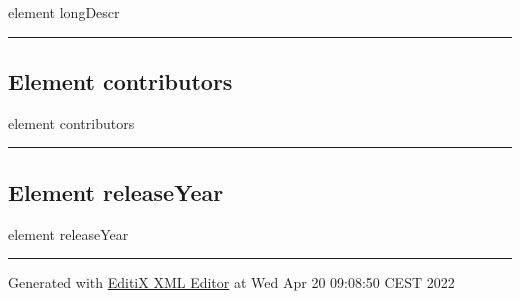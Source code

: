\documentclass[
]{article}
\begin{document}
{element longDescr}

\begin{center}\rule{0.5\linewidth}{0.5pt}\end{center}

\protect\hypertarget{element_contributors}{}{}

\hypertarget{element-contributors}{%
\subsection{\texorpdfstring{Element { contributors
}}{Element  contributors }}\label{element-contributors}}

{element contributors}

\begin{center}\rule{0.5\linewidth}{0.5pt}\end{center}

\protect\hypertarget{element_releaseYear}{}{}

\hypertarget{element-releaseyear}{%
\subsection{\texorpdfstring{Element { releaseYear
}}{Element  releaseYear }}\label{element-releaseyear}}

{element releaseYear}

\begin{center}\rule{0.5\linewidth}{0.5pt}\end{center}

{Generated with \href{http://www.editix.com}{EditiX XML Editor} at Wed
Apr 20 09:08:50 CEST 2022}
\end{document}
